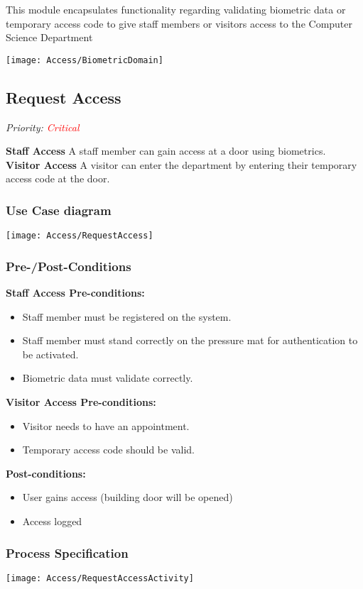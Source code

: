 
This module encapsulates functionality regarding validating biometric data or temporary access code to give staff members or visitors access to the Computer Science Department

\texttt{[image: Access/BiometricDomain]}

\subsection{Request Access}
\textit{ Priority: \textcolor{red}{Critical}} 

\textbf{Staff Access} A staff member can gain access at a door using biometrics. \\
\textbf{Visitor Access} A visitor can enter the department by entering their temporary access code at the door.

\subsubsection{Use Case diagram}
\texttt{[image: Access/RequestAccess]}

\subsubsection{Pre-/Post-Conditions}
\textbf{Staff Access Pre-conditions:} 
	\begin{itemize}
		\item Staff member must be registered on the system.
		\item Staff member must stand correctly on the pressure mat for authentication to be activated. 
		\item Biometric data must validate correctly.
	\end{itemize}
\textbf{Visitor Access Pre-conditions:} 
	\begin{itemize}
		\item Visitor needs to have an appointment.
		\item Temporary access code should be valid.
	\end{itemize}
\textbf{ Post-conditions:} 
	\begin{itemize}
		\item User gains access (building door will be opened)
		\item Access logged
	\end{itemize}
	
\subsubsection{Process Specification}
	\texttt{[image: Access/RequestAccessActivity]}	

